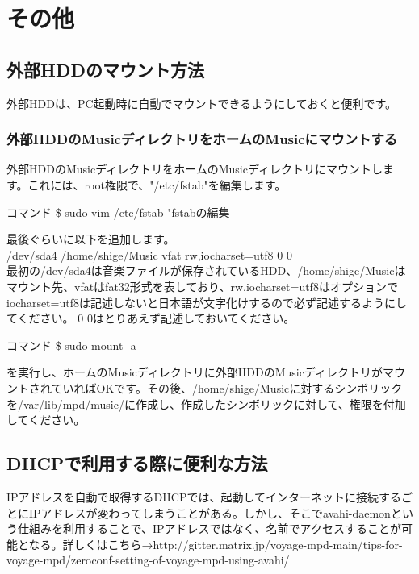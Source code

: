 \documentclass[11pt,a4paper]{jsarticle}
\begin{document}
\section{その他}
\subsection{外部HDDのマウント方法}
外部HDDは、PC起動時に自動でマウントできるようにしておくと便利です。
\subsubsection{外部HDDのMusicディレクトリをホームのMusicにマウントする}
外部HDDのMusicディレクトリをホームのMusicディレクトリにマウントします。これには、root権限で、"/etc/fstab"を編集します。
\begin{itembox}[l]{コマンド}
\$ sudo vim /etc/fstab "fstabの編集
\end{itembox}
最後ぐらいに以下を追加します。\\
\linebreak
/dev/sda4 /home/shige/Music vfat rw,iocharset=utf8 0 0\\
\linebreak
最初の/dev/sda4は音楽ファイルが保存されているHDD、/home/shige/Musicはマウント先、vfatはfat32形式を表しており、rw,iocharset=utf8はオプションでiocharset=utf8は記述しないと日本語が文字化けするので必ず記述するようにしてください。 0 0はとりあえず記述しておいてください。
\begin{itembox}[l]{コマンド}
\$ sudo mount -a
\end{itembox}
を実行し、ホームのMusicディレクトリに外部HDDのMusicディレクトリがマウントされていればOKです。その後、/home/shige/Musicに対するシンボリックを/var/lib/mpd/music/に作成し、作成したシンボリックに対して、権限を付加してください。
\subsection{DHCPで利用する際に便利な方法}
IPアドレスを自動で取得するDHCPでは、起動してインターネットに接続するごとにIPアドレスが変わってしまうことがある。しかし、そこでavahi-daemonという仕組みを利用することで、IPアドレスではなく、名前でアクセスすることが可能となる。詳しくはこちら→http://gitter.matrix.jp/voyage-mpd-main/tips-for-voyage-mpd/zeroconf-setting-of-voyage-mpd-using-avahi/
%
%
\end{document}
